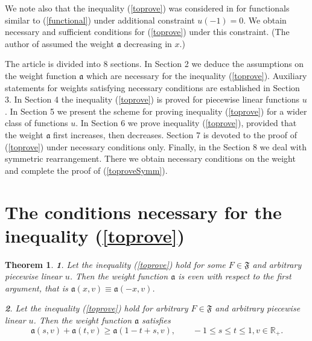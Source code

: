 \documentclass[12pt]{article}
\newcommand{\Real}{\mathbb R}
\renewcommand{\ge}{\geqslant}
\renewcommand{\le}{\leqslant}
\newtheorem{thm}{Theorem}
\begin{document}
We note also that the inequality (\ref{toprove}) was considered in \cite{Lan}
for functionals similar to (\ref{functional}) under additional constraint $u(-1) = 0$.
We obtain necessary and sufficient conditions for (\ref{toprove}) under this constraint.
(The author of \cite{Lan} assumed the weight $\mathfrak a$ decreasing in $x$.)

The article is divided into 8 sections.
In Section 2 we deduce the assumptions on the weight function $\mathfrak a$ which are necessary for the 
inequality (\ref{toprove}).
Auxiliary statements for weights satisfying necessary conditions are established in Section 3.
In Section 4 the inequality (\ref{toprove}) is proved for piecewise linear functions $u$.
In Section 5 we present the scheme for proving inequality (\ref{toprove}) for a wider class of 
functions $u$.
In Section 6 we prove inequality (\ref{toprove}), provided that the weight $\mathfrak a$ first increases, 
then decreases.
Section 7 is devoted to the proof of (\ref{toprove}) under necessary conditions only.
Finally, in the Section 8 we deal with symmetric rearrangement.
There we obtain necessary conditions on the weight and complete the proof of (\ref{toproveSymm}).

\section{The conditions necessary for the inequality (\ref{toprove})}

\begin{thm}
\label{necessary}
{\bf 1}. Let the inequality (\ref{toprove}) hold for some $F \in \mathfrak {F}$
and arbitrary piecewise linear $u$. Then the weight function $\mathfrak a$ is even with respect to the first argument,
that is $\mathfrak a(x, v) \equiv \mathfrak a(-x, v)$.

{\bf 2}. Let the inequality (\ref{toprove}) hold for arbitrary $F \in \mathfrak{F}$
and arbitrary piecewise linear $u$. Then the weight function $\mathfrak a$ satisfies
\begin{equation}
\label{almostConcave}
\mathfrak a(s, v) + \mathfrak a(t, v) \ge \mathfrak a(1 - t + s, v), \qquad -1 \le s \le t \le 1, v \in \Real_+.
\end{equation}
\end{thm}
\end{document}
